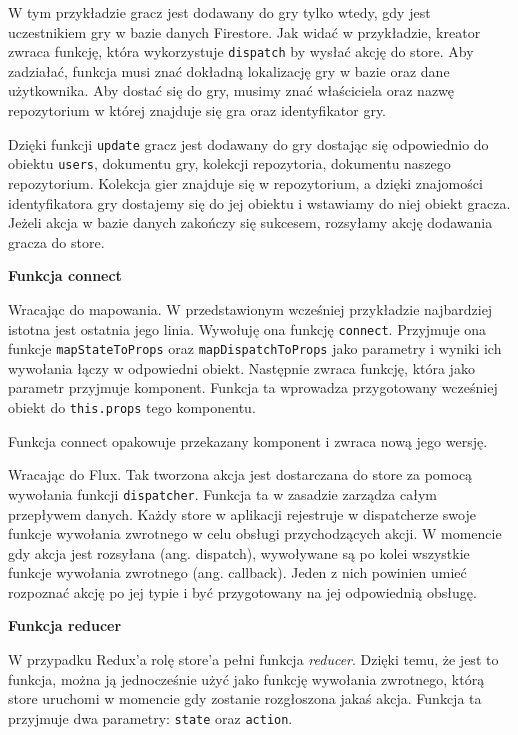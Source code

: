 W tym przykładzie gracz jest dodawany do gry tylko wtedy,
gdy jest uczestnikiem gry w bazie danych Firestore.
Jak widać w przykładzie, kreator zwraca funkcję,
która wykorzystuje \texttt{dispatch} by wysłać akcję do store.
Aby zadziałać, funkcja musi znać dokładną lokalizację gry w bazie oraz dane użytkownika.
Aby dostać się do gry, musimy znać właściciela oraz nazwę repozytorium w której znajduje się gra
oraz identyfikator gry.

Dzięki funkcji \texttt{update} gracz jest dodawany do gry dostając się odpowiednio do obiektu \texttt{users},
dokumentu gry, kolekcji repozytoria, dokumentu naszego repozytorium.
Kolekcja gier znajduje się w repozytorium, a dzięki znajomości identyfikatora gry
dostajemy się do jej obiektu i wstawiamy do niej obiekt gracza.
Jeżeli akcja w bazie danych zakończy się sukcesem, rozsyłamy akcję dodawania gracza do store.

\begin{center}
	\textbf{Funkcja connect}
\end{center}
Wracając do mapowania. W przedstawionym wcześniej przykładzie najbardziej istotna jest ostatnia jego linia.
Wywołuję ona funkcję \texttt{connect}.
Przyjmuje ona funkcje \texttt{mapStateToProps} oraz \texttt{mapDispatchToProps}
jako parametry i wyniki ich wywołania łączy w odpowiedni obiekt.
Następnie zwraca funkcję, która jako parametr przyjmuje komponent.
Funkcja ta wprowadza przygotowany wcześniej obiekt do \texttt{this.props} tego komponentu.

Funkcja connect opakowuje przekazany komponent i zwraca nową jego wersję.

Wracając do Flux. Tak tworzona akcja jest dostarczana do store za pomocą wywołania funkcji \texttt{dispatcher}.
Funkcja ta w zasadzie zarządza całym przepływem danych.
Każdy store w aplikacji rejestruje w dispatcherze swoje funkcje wywołania zwrotnego
w celu obsługi przychodzących akcji.
W momencie gdy akcja jest rozsyłana (ang. dispatch), wywoływane są po kolei wszystkie
funkcje wywołania zwrotnego (ang. callback).
Jeden z nich powinien umieć rozpoznać akcję po jej typie i być przygotowany na jej odpowiednią obsługę.

\begin{center}
	\textbf{Funkcja reducer}
\end{center}

W przypadku Redux'a rolę store'a pełni funkcja \textit{reducer}. Dzięki temu, że jest to funkcja,
można ją jednocześnie użyć jako funkcję wywołania zwrotnego,
którą store uruchomi w momencie gdy zostanie rozgłoszona jakaś akcja.
Funkcja ta przyjmuje dwa parametry: \texttt{state} oraz \texttt{action}.

